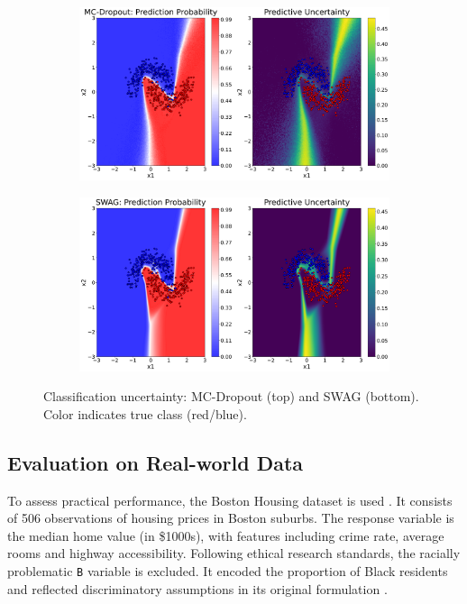 \begin{figure}[ht]
  \centering
  \begin{subfigure}{0.8\textwidth}
    \centering
    \includegraphics[width=\textwidth]{plots/mcd_classification.png}
  \end{subfigure}
  
  \vspace{0.3cm}
  \begin{subfigure}{0.8\textwidth}
    \centering
    \includegraphics[width=\textwidth]{plots/swag_classification.png}
  \end{subfigure}
  \caption{Classification uncertainty: MC-Dropout (top) and SWAG (bottom). Color indicates true class (red/blue).}
  \label{fig:classification}
\end{figure}

\FloatBarrier



\newpage
\subsection{Evaluation on Real-world Data}
\label{exp:real-world_data}
To assess practical performance, the Boston Housing dataset is used \citep{harrison1978bh}.
It consists of 506 observations of housing prices in Boston suburbs. The response variable is the median
home value (in \$1000s), with features including crime rate, average rooms and highway accessibility.
Following ethical research standards, the racially problematic \texttt{B} variable is excluded.
It encoded the proportion of Black residents and reflected discriminatory assumptions in its original
formulation \citep[see, e.g.,][]{carlisle2020bh_ethicalIssue}.

